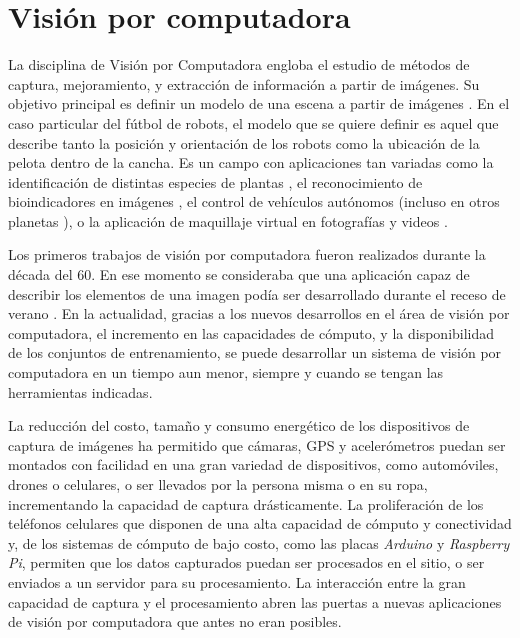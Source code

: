 
\section{Visión por computadora}

La disciplina de Visión por Computadora engloba el estudio de métodos de
captura, mejoramiento, y extracción de información a partir de imágenes. Su
objetivo principal es definir un modelo de una escena a partir de imágenes
\cite{cvLinda2001}. En el caso particular del fútbol de robots, el modelo que se
quiere definir es aquel que describe tanto la posición y orientación de los
robots como la ubicación de la pelota dentro de la cancha. Es un campo con
aplicaciones tan variadas como la identificación de distintas especies de
plantas \cite{plantIdentificacionUCVT2018}, el reconocimiento de bioindicadores
en imágenes \cite{anurosEmImagm2016}, el control de vehículos autónomos
\cite{e2eLearning4SDC} (incluso en otros planetas
\cite{twoYearsMarsRovers2007}), o la aplicación de maquillaje virtual en
fotografías y videos \cite{virtualMakeup2015}.

Los primeros trabajos de visión por computadora fueron realizados durante la
década del 60. En ese momento se consideraba que una aplicación capaz de
describir los elementos de una imagen podía ser desarrollado durante el receso
de verano \cite{summerVisionProject1966}. En la actualidad, gracias a los nuevos
desarrollos en el área de visión por computadora, el incremento en las
capacidades de cómputo, y la disponibilidad de los conjuntos de entrenamiento,
se puede desarrollar un sistema de visión por computadora en un tiempo aun
menor, siempre y cuando se tengan las herramientas indicadas.

La reducción del costo, tamaño y consumo energético de los dispositivos de
captura de imágenes ha permitido que cámaras, GPS y acelerómetros puedan ser
montados con facilidad en una gran variedad de dispositivos, como automóviles,
drones o celulares, o ser llevados por la persona misma o en su ropa,
incrementando la capacidad de captura drásticamente. La proliferación de los
teléfonos celulares que disponen de una alta capacidad de cómputo y conectividad
y, de los sistemas de cómputo de bajo costo, como las placas \emph{Arduino} y
\emph{Raspberry Pi}, permiten que los datos capturados puedan ser procesados en
el sitio, o ser enviados a un servidor para su procesamiento. La interacción
entre la gran capacidad de captura y el procesamiento abren las puertas a nuevas
aplicaciones de visión por computadora que antes no eran posibles.

